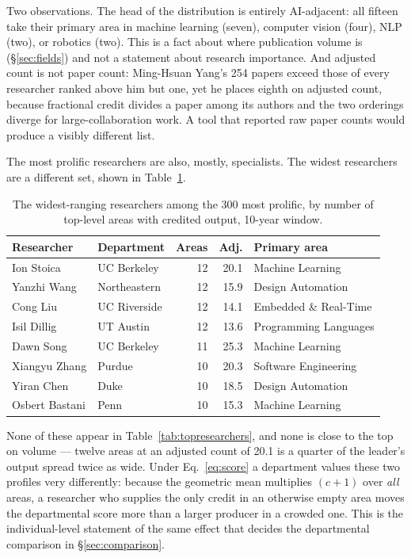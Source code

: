 \documentclass[11pt]{article}
\begin{document}
Two observations. The head of the distribution is entirely AI-adjacent: all
fifteen take their primary area in machine learning (seven), computer vision
(four), NLP (two), or robotics (two). This is a fact about where publication
volume is (\S\ref{sec:fields}) and not a statement about research importance.
And adjusted count is not paper count: Ming-Hsuan Yang's 254 papers exceed
those of every researcher ranked above him but one, yet he places eighth on
adjusted count, because fractional credit divides a paper among its authors and
the two orderings diverge for large-collaboration work. A tool that reported
raw paper counts would produce a visibly different list.

The most prolific researchers are also, mostly, specialists. The widest
researchers are a different set, shown in Table~\ref{tab:broadest}.

\begin{table}[t]
\centering
\caption{The widest-ranging researchers among the 300 most prolific, by number
of top-level areas with credited output, 10-year window.}
\label{tab:broadest}
\begin{tabular}{llrrl}
\toprule
Researcher & Department & Areas & Adj. & Primary area \\
\midrule
Ion Stoica     & UC Berkeley  & 12 & 20.1 & Machine Learning \\
Yanzhi Wang    & Northeastern & 12 & 15.9 & Design Automation \\
Cong Liu       & UC Riverside & 12 & 14.1 & Embedded \& Real-Time \\
Isil Dillig    & UT Austin    & 12 & 13.6 & Programming Languages \\
Dawn Song      & UC Berkeley  & 11 & 25.3 & Machine Learning \\
Xiangyu Zhang  & Purdue       & 10 & 20.3 & Software Engineering \\
Yiran Chen     & Duke         & 10 & 18.5 & Design Automation \\
Osbert Bastani & Penn         & 10 & 15.3 & Machine Learning \\
\bottomrule
\end{tabular}
\end{table}

None of these appear in Table~\ref{tab:topresearchers}, and none is close to
the top on volume --- twelve areas at an adjusted count of 20.1 is a quarter of
the leader's output spread twice as wide. Under Eq.~\ref{eq:score} a department
values these two profiles very differently: because the geometric mean
multiplies $(c+1)$ over \emph{all} areas, a researcher who supplies the only
credit in an otherwise empty area moves the departmental score more than a
larger producer in a crowded one. This is the individual-level statement of the
same effect that decides the departmental comparison in
\S\ref{sec:comparison}.
\end{document}
